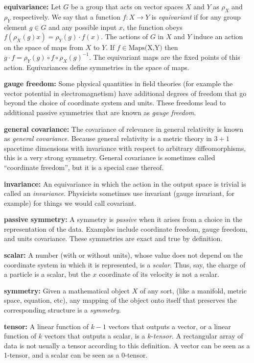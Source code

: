 \documentclass{article}
\theoremstyle{plain}
\theoremstyle{definition}
\theoremstyle{remark}
\begin{document}
\textbf{equivariance:}
Let $G$ be a group that acts on vector spaces $X$ and $Y$ as $\rho_X$ and $\rho_Y$ respectively. We say that a function $f:X\to Y$ is \emph{equivariant} if for any group element $g\in G$ and any possible input $x$, the function obeys $f( \rho_X(g) x) = \rho_Y(g)\cdot f(x)$.
The actions of $G$ in $X$ and $Y$ induce an action on the space of maps from $X$ to $Y$. If $f\in \text{Maps(X,Y)}$ then $g\cdot f = \rho_Y(g)\circ f \circ \rho_X(g)^{-1}$.
The equivariant maps are the fixed points of this action.
Equivariances define symmetries in the space of maps. 

\textbf{gauge freedom:}
Some physical quantities in field theories (for example the vector potential in electromagnetism) have additional degrees of freedom that go beyond the choice of coordinate system and units.
These freedoms lead to additional passive symmetries that are known as \emph{gauge freedom}.

\textbf{general covariance:}
The covariance of relevance in general relativity \cite{einstein} is known as \emph{general covariance}.
Because general relativity is a metric theory in $3+1$ spacetime dimensions with invariance with respect to arbitrary diffeomorphisms, this is a very strong symmetry.
General covariance is sometimes called ``coordinate freedom'', but it is a special case thereof.

\textbf{invariance:}
An equivariance in which the action in the output space is trivial is called an \emph{invariance}. Physicists sometimes use invariant (gauge invariant, for example) for things we would call covariant.

\textbf{passive symmetry:}
A symmetry is \emph{passive} when it arises from a choice in the representation of the data. 
Examples include coordinate freedom, gauge freedom, and units covariance.
These symmetries are exact and true by definition.

\textbf{scalar:}
A number (with or without units), whose value does not depend on the coordinate system in which it is represented, is a \emph{scalar}.
Thus, say, the charge of a particle is a scalar, but the $x$ coordinate of its velocity is not a scalar.

\textbf{symmetry:}
Given a mathematical object $X$ of any sort, (like a manifold, metric space, equation, etc), any mapping of the object onto itself that preserves the corresponding structure is a \emph{symmetry}.

\textbf{tensor:}
A linear function of $k-1$ vectors that outputs a vector, or a linear function of $k$ vectors that outputs a scalar, is a $k$-\emph{tensor}.
A rectangular array of data is not usually a tensor according to this definition.
A vector can be seen as a 1-tensor, and a scalar can be seen as a 0-tensor.
\end{document}
